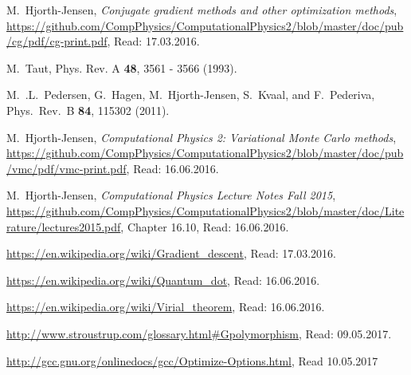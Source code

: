 \documentclass[../main.tex]{subfiles}
\begin{document}
\begin{thebibliography}{9}

 M.~Hjorth-Jensen, {\em Conjugate gradient methods and other optimization methods},  \url{https://github.com/CompPhysics/ComputationalPhysics2/blob/master/doc/pub/cg/pdf/cg-print.pdf}, Read: 17.03.2016.

 M.~Taut, Phys. Rev. A {\bf 48}, 3561 - 3566 (1993).

 M.~.L.~Pedersen, G.~Hagen, M.~Hjorth-Jensen, S.~Kvaal,  and F.~Pederiva, Phys.~Rev.~B {\bf 84}, 115302 (2011).

 M.~Hjorth-Jensen, \emph{Computational Physics 2: Variational Monte Carlo methods}, \url{https://github.com/CompPhysics/ComputationalPhysics2/blob/master/doc/pub/vmc/pdf/vmc-print.pdf}, Read: 16.06.2016.

 M.~Hjorth-Jensen, \emph{Computational Physics Lecture Notes Fall 2015},  \url{https://github.com/CompPhysics/ComputationalPhysics2/blob/master/doc/Literature/lectures2015.pdf}, Chapter 16.10, Read: 16.06.2016.

 \url{https://en.wikipedia.org/wiki/Gradient_descent}, Read: 17.03.2016.

 \url{https://en.wikipedia.org/wiki/Quantum_dot}, Read: 16.06.2016.

 \url{https://en.wikipedia.org/wiki/Virial_theorem}, Read: 16.06.2016.

 \url{http://www.stroustrup.com/glossary.html#Gpolymorphism}, Read: 09.05.2017.

 \url{http://gcc.gnu.org/onlinedocs/gcc/Optimize-Options.html}, Read 10.05.2017

\end{thebibliography}
\end{document}
